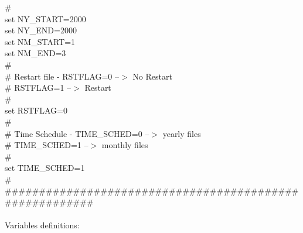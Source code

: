 \#\\
set NY\_START=2000\\
set NY\_END=2000\\
set NM\_START=1\\
set NM\_END=3\\
\#\\
\#  Restart file - RSTFLAG=0 --$>$ No Restart\\
\#		  RSTFLAG=1 --$>$ Restart\\
\#\\
set RSTFLAG=0\\
\#\\
\#  Time Schedule  -  TIME\_SCHED=0 --$>$ yearly files\\
\#                    TIME\_SCHED=1 --$>$ monthly files\\
\#\\
set TIME\_SCHED=1\\
\#\\
\#\#\#\#\#\#\#\#\#\#\#\#\#\#\#\#\#\#\#\#\#\#\#\#\#\#\#\#\#\#\#\#\#\#\#\#\#\#\#\#\#\#\#\#\#\#\#\#\#\#\#\#\#\#\#\#
\\
\\
Variables definitions:
